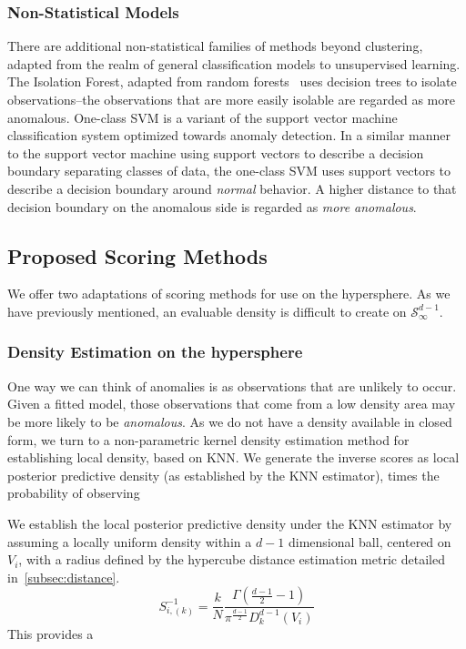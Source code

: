 \subsubsection{Non-Statistical Models}
There are additional non-statistical families of methods beyond clustering, adapted from the realm
  of general classification models to unsupervised learning.  The Isolation Forest,\citep{liu2000}
  adapted from random forests~\citep{breiman2001} uses decision trees to isolate observations--the
  observations that are more easily isolable are regarded as more anomalous.  One-class SVM is a
  variant of the support vector machine classification system optimized towards anomaly detection.
  In a similar manner to the support vector machine using support vectors to describe a decision
  boundary separating classes of data, the one-class SVM uses support vectors to describe a decision
  boundary around \emph{normal} behavior.  A higher distance to that decision boundary on the
  anomalous side is regarded as \emph{more anomalous}.

\subsection{Proposed Scoring Methods}
We offer two adaptations of scoring methods for use on the hypersphere.  As we have previously
  mentioned, an evaluable density is difficult to create on $\mathcal{S}_{\infty}^{d-1}$.

\subsubsection{Density Estimation on the hypersphere}
One way we can think of anomalies is as observations that are unlikely to occur.  Given a fitted model,
  those observations that come from a low density area may be more likely to be \emph{anomalous}.
  As we do not have a density available in closed form, we turn to a non-parametric kernel density
  estimation method for establishing local density, based on KNN.  We generate the inverse scores as
  local posterior predictive density (as established by the KNN estimator), times the probability of
  observing

We establish the local posterior predictive density under the KNN estimator by assuming a locally
  uniform density within a $d-1$ dimensional ball, centered on $V_i$, with a radius defined by
  the hypercube distance estimation metric detailed in~\ref{subsec:distance}.
  \begin{equation}
    \label{eqn:ad_knn}
      S_{i,(k)}^{-1} =
        \frac{k}{N}\frac{\Gamma\left(\frac{d-1}{2} - 1\right)}{\pi^{\frac{d-1}{2}}D_{k}^{d-1}(V_i)}
  \end{equation}
  This provides a

